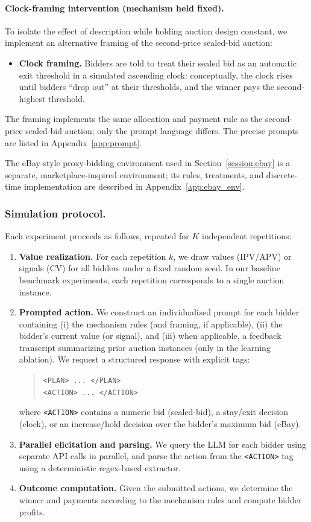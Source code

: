 \documentclass[acmsmall,screen,review]{acmart}
\begin{document}
\paragraph{Clock-framing intervention (mechanism held fixed).}
To isolate the effect of description while holding auction design constant, we implement an alternative framing of the second-price sealed-bid auction:
\begin{itemize}
    \item \textbf{Clock framing.} Bidders are told to treat their sealed bid as an automatic exit threshold in a simulated ascending clock: conceptually, the clock rises until bidders ``drop out'' at their thresholds, and the winner pays the second-highest threshold.
\end{itemize}
The framing implements the same allocation and payment rule as the second-price sealed-bid auction; only the prompt language differs. The precise prompts are listed in Appendix~\ref{app:prompt}.

The eBay-style proxy-bidding environment used in Section~\ref{session:ebay} is a separate, marketplace-inspired environment; its rules, treatments, and discrete-time implementation are described in Appendix~\ref{app:ebay_env}.

\subsubsection{Simulation protocol.}
Each experiment proceeds as follows, repeated for $K$ independent repetitions:
\begin{enumerate}
    \item \textbf{Value realization.} For each repetition $k$, we draw values (IPV/APV) or signals (CV) for all bidders under a fixed random seed. In our baseline benchmark experiments, each repetition corresponds to a single auction instance.
    \item \textbf{Prompted action.} We construct an individualized prompt for each bidder containing (i) the mechanism rules (and framing, if applicable), (ii) the bidder's current value (or signal), and (iii) when applicable, a feedback transcript summarizing prior auction instances (only in the learning ablation). We request a structured response with explicit tags:
\begin{quote}\small
\verb|<PLAN> ... </PLAN>| \\
\verb|<ACTION> ... </ACTION>|
\end{quote}
where \verb|<ACTION>| contains a numeric bid (sealed-bid), a stay/exit decision (clock), or an increase/hold decision over the bidder's maximum bid (eBay).
    \item \textbf{Parallel elicitation and parsing.} We query the LLM for each bidder using separate API calls in parallel, and parse the action from the \verb|<ACTION>| tag using a deterministic regex-based extractor.
    \item \textbf{Outcome computation.} Given the submitted actions, we determine the winner and payments according to the mechanism rules and compute bidder profits.
\end{enumerate}
\end{document}
